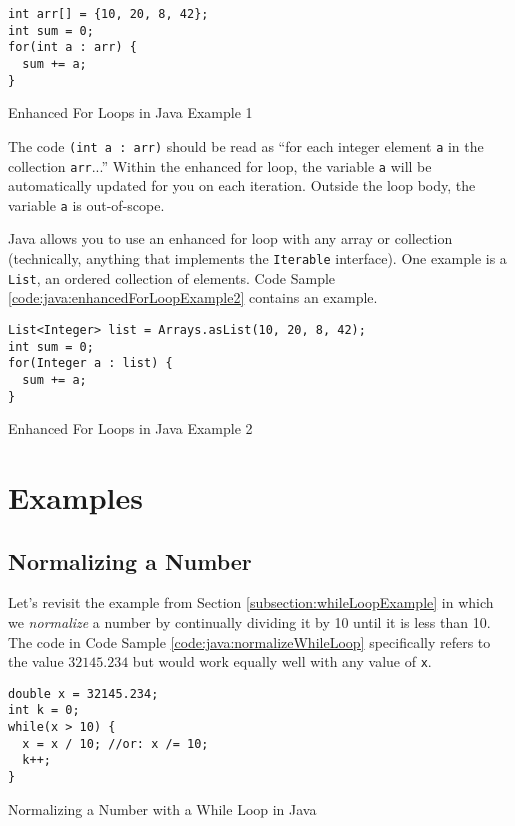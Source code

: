 \begin{listing}[H]
\begin{verbatim}
int arr[] = {10, 20, 8, 42};
int sum = 0;
for(int a : arr) {
  sum += a;
}
\end{verbatim}
  \caption{Enhanced For Loops in Java Example 1}
  \label{code:java:enhancedForLoopExample1}
\end{listing}

The code \texttt{(int a : arr)} should be read as ``for each
integer element \texttt{a} in the collection \texttt{arr}...''
Within the enhanced for loop, the variable \texttt{a} will
be automatically updated for you on each iteration.  Outside the
loop body, the variable \texttt{a} is out-of-scope.  

Java allows you to use an enhanced for loop with any array or collection
(technically, anything that implements the \texttt{Iterable} 
interface).  One example is a \texttt{List}, an ordered
collection of elements.  Code Sample \ref{code:java:enhancedForLoopExample2} 
contains an example.

\begin{listing}[H]
\begin{verbatim}
List<Integer> list = Arrays.asList(10, 20, 8, 42);
int sum = 0;
for(Integer a : list) {
  sum += a;
}
\end{verbatim}
  \caption{Enhanced For Loops in Java Example 2}
  \label{code:java:enhancedForLoopExample2}
\end{listing}

\section{Examples}

\subsection{Normalizing a Number}

Let's revisit the example from Section \ref{subsection:whileLoopExample} in which 
we \emph{normalize} a number by continually dividing it by 10 until it is less 
than 10.  The code in Code Sample \ref{code:java:normalizeWhileLoop} specifically
refers to the value $32145.234$ but would work equally well with any value of 
\texttt{x}.

\begin{listing}[H]
\begin{verbatim}
double x = 32145.234;
int k = 0;
while(x > 10) {
  x = x / 10; //or: x /= 10;
  k++;
}
\end{verbatim}
  \caption{Normalizing a Number with a While Loop in Java}
  \label{code:java:normalizeWhileLoop}
\end{listing}

